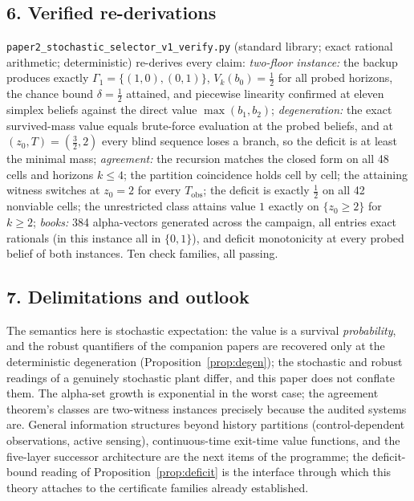 \documentclass[10pt,twocolumn]{article}
\theoremstyle{definition}
\begin{document}
\subsection{6. Verified re-derivations}\label{verified}

\texttt{paper2\_stochastic\_selector\_v1\_verify.py} (standard library;
exact rational arithmetic; deterministic) re-derives every claim:
\emph{two-floor instance:} the backup produces exactly
\(\Gamma_{1} = \{(1,0), (0,1)\}\), \(V_{k}(b_{0}) = \tfrac12\) for all
probed horizons, the chance bound \(\delta = \tfrac12\) attained, and
piecewise linearity confirmed at eleven simplex beliefs against the direct
value \(\max(b_{1}, b_{2})\); \emph{degeneration:} the exact survived-mass
value equals brute-force evaluation at the probed beliefs, and at
\((z_{0}, T) = (\tfrac32, 2)\) every blind sequence loses a branch, so the
deficit is at least the minimal mass; \emph{agreement:} the recursion
matches the closed form on all 48 cells and horizons \(k \le 4\); the
partition coincidence holds cell by cell; the attaining witness switches at
\(z_{0} = 2\) for every \(T_{\mathrm{obs}}\); the deficit is exactly
\(\tfrac12\) on all 42 nonviable cells; the unrestricted class attains
value \(1\) exactly on \(\{z_{0} \ge 2\}\) for \(k \ge 2\); \emph{books:}
384 alpha-vectors generated across the campaign, all entries exact
rationals (in this instance all in \(\{0,1\}\)), and deficit monotonicity
at every probed belief of both instances. Ten check families, all passing.

\subsection{7. Delimitations and outlook}\label{scope}

The semantics here is stochastic expectation: the value is a survival
\emph{probability}, and the robust quantifiers of the companion papers are
recovered only at the deterministic degeneration
(Proposition~\ref{prop:degen}); the stochastic and robust readings of a
genuinely stochastic plant differ, and this paper does not conflate them.
The alpha-set growth is exponential in the worst case; the agreement
theorem's classes are two-witness instances precisely because the audited
systems are. General information structures beyond history partitions
(control-dependent observations, active sensing), continuous-time exit-time
value functions, and the five-layer successor architecture are the next
items of the programme; the deficit-bound reading of
Proposition~\ref{prop:deficit} is the interface through which this theory
attaches to the certificate families already established.
\end{document}
